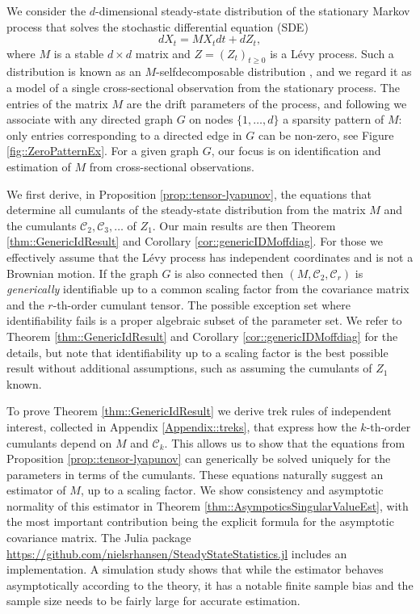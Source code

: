 \documentclass{biometrika}
\begin{document}
We consider the $d$-dimensional steady-state distribution of the stationary Markov process that solves the stochastic differential equation (SDE)
\begin{equation}
    \label{eq::SDErep}
    dX_t = M X_t dt + dZ_t, 
\end{equation}
where $M$ is a stable $d \times d$ matrix and $Z = (Z_t)_{t \geq 0}$ is a Lévy process. Such a distribution is known as an $M$-selfdecomposable distribution \citep{Sato:1984, Masuda:2004}, 
and we regard it as a model of a single cross-sectional observation from the stationary process.
The entries of the matrix $M$ are the drift parameters of the process, and following \cite{varando20a}
we associate with any directed graph $G$ on nodes $\{1, \ldots, d\}$ 
a sparsity pattern of $M$: only entries corresponding to a directed edge
in $G$ can be non-zero, see Figure \ref{fig::ZeroPatternEx}. 
For a given graph $G$, our focus is on 
identification and estimation of $M$ from cross-sectional observations. 

We first derive, in Proposition \ref{prop::tensor-lyapunov}, the 
equations that determine all cumulants of the steady-state distribution from the 
matrix $M$ and the cumulants $\mathcal{C}_2, \mathcal{C}_3, \ldots$ of $Z_1$. Our main results are then Theorem \ref{thm::GenericIdResult} and Corollary \ref{cor::genericIDMoffdiag}. For those 
we effectively assume that the Lévy process has independent coordinates and is not 
a Brownian motion. If the graph $G$ is also connected then
$(M, \mathcal{C}_2, \mathcal{C}_r)$ is \emph{generically} identifiable up to a common scaling factor
from the covariance matrix and the $r$-th-order cumulant tensor. The possible exception set where identifiability fails is a proper algebraic subset of the parameter set. We refer to Theorem \ref{thm::GenericIdResult} and Corollary \ref{cor::genericIDMoffdiag} for the details, 
but note that identifiability up to a scaling factor is the best possible result without 
additional assumptions, such as assuming the cumulants of $Z_1$ known.

To prove Theorem \ref{thm::GenericIdResult} we derive trek rules of independent interest, collected in Appendix \ref{Appendix::treks}, that express how the $k$-th-order cumulants depend on $M$
and $\mathcal{C}_k$. This allows us to show that the equations from Proposition \ref{prop::tensor-lyapunov} can generically be solved uniquely for the parameters in terms of the cumulants. These equations naturally suggest an estimator of $M$, up to a scaling factor.
We show consistency and asymptotic normality of this estimator in Theorem \ref{thm::AsympoticsSingularValueEst}, with the most important contribution being the explicit formula for the asymptotic covariance matrix. The Julia package \url{https://github.com/nielsrhansen/SteadyStateStatistics.jl} includes an 
implementation. A simulation study shows that while 
the estimator behaves asymptotically according to the theory, it has a notable 
finite sample bias and the sample size needs to be fairly large for accurate 
estimation.
\end{document}
